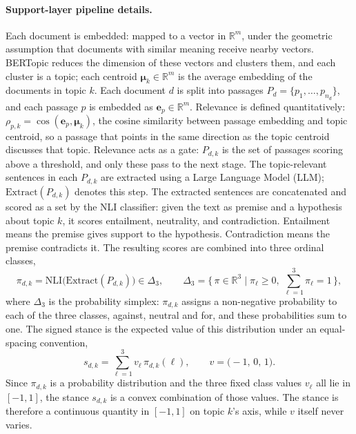 \paragraph{Support-layer pipeline details.}
Each document is embedded: mapped to a vector in $\mathbb{R}^{m}$, under the geometric assumption
that documents with similar meaning receive nearby vectors. BERTopic reduces the dimension of
these vectors and clusters them, and each cluster is a topic; each centroid
$\boldsymbol{\mu}_k \in \mathbb{R}^{m}$ is the average embedding of the documents in topic $k$.
Each document $d$ is split into passages $P_d = \{p_1, \dots, p_{n_d}\}$, and each passage $p$ is
embedded as $\mathbf{e}_p \in \mathbb{R}^{m}$. Relevance is defined quantitatively:
$\rho_{p,k} = \cos(\mathbf{e}_p, \boldsymbol{\mu}_k)$, the cosine similarity between passage
embedding and topic centroid, so a passage that points in the same direction as the topic
centroid discusses that topic. Relevance acts as a gate: $P_{d,k}$ is the set of passages scoring
above a threshold, and only these pass to the next stage. The topic-relevant sentences in each
$P_{d,k}$ are extracted using a Large Language Model (LLM); $\mathrm{Extract}(P_{d,k})$ denotes
this step. The extracted sentences are concatenated and scored as a set by the NLI classifier:
given the text as premise and a hypothesis about topic $k$, it scores entailment, neutrality, and
contradiction. Entailment means the premise gives support to the hypothesis. Contradiction means
the premise contradicts it. The resulting scores are combined into three ordinal classes,
\begin{equation}
  \pi_{d,k} = \mathrm{NLI}\big(\mathrm{Extract}(P_{d,k})\big)
            \in \Delta_3, \qquad
  \Delta_3 = \Big\{\, \pi \in \mathbb{R}^{3} \;\big|\;
            \pi_\ell \ge 0,\ \textstyle\sum_{\ell=1}^{3}\pi_\ell = 1 \,\Big\},
\label{eq:stance-dist}
\end{equation}
where $\Delta_3$ is the probability simplex: $\pi_{d,k}$ assigns a non-negative probability to
each of the three classes, against, neutral and for, and these probabilities sum to one. The
signed stance is the expected value of this distribution under an equal-spacing convention,
\begin{equation}
  s_{d,k} = \sum_{\ell=1}^{3} v_\ell\,\pi_{d,k}(\ell),
  \qquad v = \big(-1,\,0,\,1\big).
  \label{eq:stance}
\end{equation}
Since $\pi_{d,k}$ is a probability distribution and the three fixed class values $v_\ell$ all lie
in $[-1,1]$, the stance $s_{d,k}$ is a convex combination of those values. The stance is
therefore a continuous quantity in $[-1,1]$ on topic $k$'s axis, while $v$ itself never varies.

